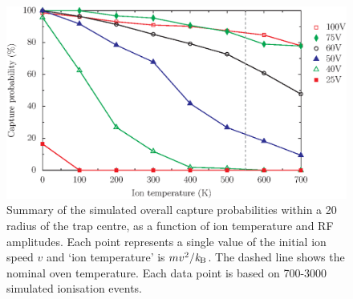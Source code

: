  \begin{figure}[h!t]
 \centering
 \includegraphics[width=14.5cm]{chapter3/tempcapture/temp_capture_v4}
 \caption[Ion capture probabilities in Sandia trap]{Summary of the simulated overall capture probabilities within a 20\um\, radius of the trap centre, as a function of ion temperature and RF amplitudes. Each point represents a single value of the initial ion speed $v$ and `ion temperature' is $m v^2 / \mbox{{\it k}$_{\rm B}$}$. The dashed line shows the nominal \CaI{} oven temperature. Each data point is based on 700-3000 simulated ionisation events.}
 \label{fig:captureprobvolt}
 \end{figure} 


